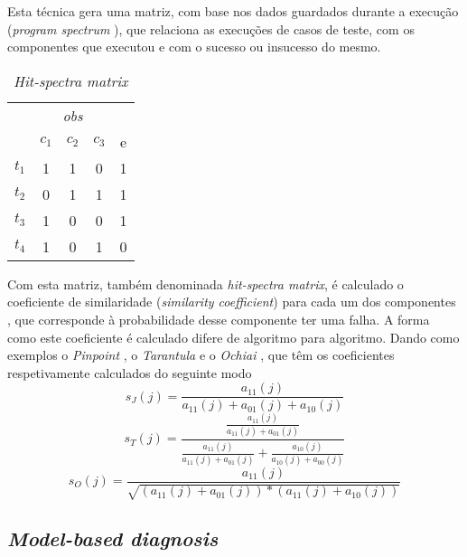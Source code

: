 Esta técnica gera uma matriz, com base nos dados guardados durante a execução (\emph{program spectrum} \cite{Reps1997}), que relaciona as execuções de casos de teste, com os componentes que executou e com o sucesso ou insucesso do mesmo.

\begin{table}[H]
	\centering
	\begin{tabular}{c|ccc|c} 
		& \multicolumn{3}{c|}{\textit{obs}} &  \\
		& $c_1$ & $c_2$ & $c_3$ & e \\ 
	 	\hline
		$t_1$ & 1 & 1 & 0 & 1 \\
		$t_2$ & 0 & 1 & 1 & 1 \\
		$t_3$ & 1 & 0 & 0 & 1 \\
		$t_4$ & 1 & 0 & 1 & 0 \\
	\end{tabular}
	\caption{\emph{Hit-spectra matrix}}
	\label{tab:hit-spectra}
\end{table}

Com esta matriz, também denominada \emph{hit-spectra matrix}, é calculado o coeficiente de similaridade (\emph{similarity coefficient}) para cada um dos componentes \cite{Abreu2009}, que corresponde à probabilidade desse componente ter uma falha. A forma como este coeficiente é calculado difere de algoritmo para algoritmo. Dando como exemplos o \emph{Pinpoint} \cite{Chen2002}, o \emph{Tarantula} \cite{Jones2005} e o \emph{Ochiai} \cite{Abreu2007}, que têm os coeficientes respetivamente calculados do seguinte modo
%
\begin{equation}
	s_J(j) = \frac {a_{11}(j)} {a_{11}(j) + a_{01}(j) + a_{10}(j)}
\end{equation}
%
\begin{equation}
	s_T(j) = \frac  { \frac {a_{11}(j)} {a_{11}(j) + a_{01}(j)} } 
				 	{ \frac{a_{11}(j)}{a_{11}(j) + a_{01}(j)} + \frac{a_{10}(j)}{a_{10}(j) + a_{00}(j)}}
\end{equation}
%
\begin{equation}
	s_O(j) = \frac  {a_{11}(j)} 
				 	{\sqrt{(a_{11}(j) + a_{01}(j)) * (a_{11}(j) + a_{10}(j))}}
\end{equation}


% 
%

\subsection{\emph{Model-based diagnosis}}

